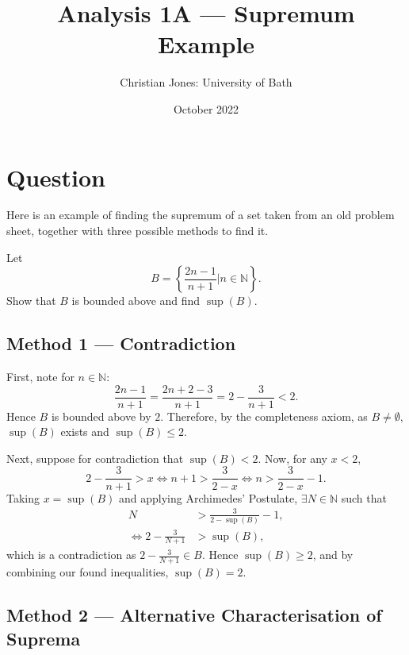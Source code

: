 \documentclass[
  17pt,
  a4paper]{extarticle}
\title{Analysis 1A --- Supremum Example}
\author{Christian Jones: University of Bath}
\date{October 2022}
\theoremstyle{plain}
\theoremstyle{definition}
\theoremstyle{plain}
\theoremstyle{plain}
\theoremstyle{plain}
\theoremstyle{plain}
\theoremstyle{definition}
\theoremstyle{definition}
\newtheorem*{Order Axioms*}{Order Axioms}\newtheorem{Order Axioms}{Order Axioms}[section]
\theoremstyle{remark}
\theoremstyle{remark}
\let\BeginKnitrBlock\begin \let\EndKnitrBlock\end
\renewcommand{\;}{\,}
\begin{document}
\maketitle

{
\setcounter{tocdepth}{2}
\tableofcontents
}
\newpage
{}

\hypertarget{question}{%
\section*{Question}\label{question}}

Here is an example of finding the supremum of a set taken from an old problem sheet, together with three possible methods to find it.
\BeginKnitrBlock{example}
{\label{exm:unnamed-chunk-2} }Let \[B = \left\lbrace \frac{2n-1}{n+1} \lvert n \in \mathbb{N}\right\rbrace.\] Show that \(B\) is bounded above and find \(\sup(B).\)
\EndKnitrBlock{example}

\hypertarget{method-1-contradiction}{%
\subsection*{Method 1 --- Contradiction}\label{method-1-contradiction}}

\BeginKnitrBlock{solution*}
First, note for \(n\in\mathbb{N}\): \[\frac{2n-1}{n+1} = \frac{2n+2-3}{n+1} = 2 - \frac{3}{n+1} < 2.\] Hence \(B\) is bounded above by \(2\). Therefore, by the completeness axiom, as \(B \neq \emptyset,\) \(\sup(B)\) exists and \(\sup(B) \leq 2.\)

Next, suppose for contradiction that \(\sup(B) < 2\). Now, for any \(x < 2,\) \[2 - \frac{3}{n+1} > x \Leftrightarrow n+1 > \frac{3}{2-x} \Leftrightarrow n > \frac{3}{2-x} - 1.\] Taking \(x = \sup(B)\) and applying Archimedes' Postulate, \(\exists N \in \mathbb{N}\) such that
\begin{align*}
N &> \frac{3}{2-\sup(B)} - 1,\\
\Leftrightarrow 2 - \frac{3}{N+1} &> \sup(B),
\end{align*}
which is a contradiction as \(2 - \frac{3}{N+1} \in B.\) Hence \(\sup(B) \geq 2\), and by combining our found inequalities, \(\sup(B)=2\).
\EndKnitrBlock{solution*}

\hypertarget{method-2-alternative-characterisation-of-suprema}{%
\subsection*{Method 2 --- Alternative Characterisation of Suprema}\label{method-2-alternative-characterisation-of-suprema}}
\end{document}
